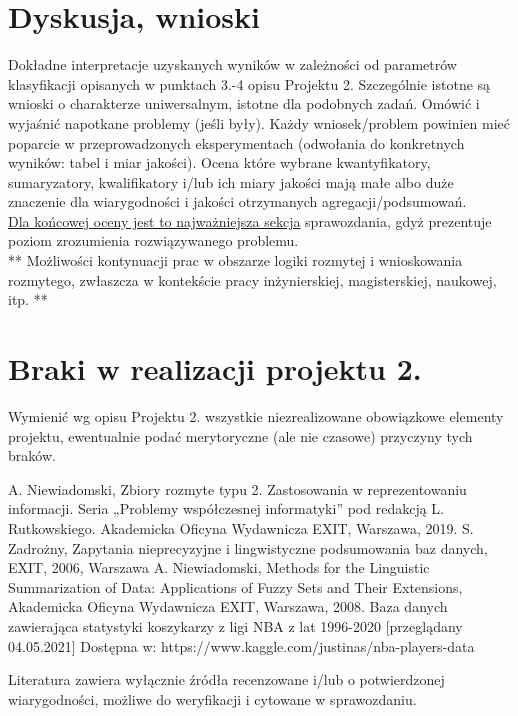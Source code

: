 \documentclass{classrep}
\begin{document}


\section{Dyskusja, wnioski}
Dokładne interpretacje uzyskanych wyników w zależności od parametrów klasyfikacji
opisanych w punktach 3.-4 opisu Projektu 2. 
Szczególnie istotne są wnioski o charakterze uniwersalnym, istotne dla podobnych zadań. 
Omówić i wyjaśnić napotkane problemy (jeśli były). Każdy wniosek/problem powinien mieć poparcie
w przeprowadzonych eksperymentach (odwołania do konkretnych wyników: tabel i miar
jakości). Ocena które wybrane kwantyfikatory, sumaryzatory, kwalifikatory i/lub ich
miary jakości mają małe albo duże znaczenie dla wiarygodności i jakości otrzymanych
agregacji/podsumowań.  \\
\underline{Dla końcowej oceny jest to najważniejsza sekcja} sprawozdania, gdyż prezentuje poziom
zrozumienia rozwiązywanego problemu.\\

** Możliwości kontynuacji prac w obszarze logiki rozmytej i wnioskowania rozmytego, zwłaszcza w kontekście pracy inżynierskiej,
magisterskiej, naukowej, itp. **\\



\section{Braki w realizacji projektu 2.}
Wymienić wg opisu Projektu 2. wszystkie niezrealizowane obowiązkowe elementy projektu, ewentualnie
podać merytoryczne (ale nie czasowe) przyczyny tych braków. 


\begin{thebibliography}{99}
  A. Niewiadomski, Zbiory rozmyte typu 2. Zastosowania w reprezentowaniu informacji.  Seria „Problemy współczesnej informatyki” pod redakcją L. Rutkowskiego. Akademicka Oficyna Wydawnicza EXIT, Warszawa, 2019.
 S. Zadrożny, Zapytania nieprecyzyjne i lingwistyczne podsumowania baz danych, EXIT, 2006, Warszawa
 A. Niewiadomski, Methods for the Linguistic Summarization of Data: Applications of Fuzzy Sets and Their Extensions, Akademicka Oficyna Wydawnicza EXIT, Warszawa, 2008.
 Baza danych zawierająca statystyki koszykarzy z ligi NBA z lat 1996-2020 [przeglądany 04.05.2021] Dostępna w:
https://www.kaggle.com/justinas/nba-players-data
\end{thebibliography}

Literatura zawiera wyłącznie źródła recenzowane i/lub o potwierdzonej wiarygodności,
możliwe do weryfikacji i cytowane w sprawozdaniu. 
\end{document}

